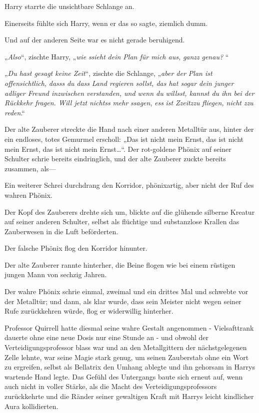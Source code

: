 {Harry starrte die unsichtbare Schlange an.

Einerseits fühlte sich Harry, wenn er das so sagte, ziemlich dumm.

Und auf der anderen Seite war es nicht gerade beruhigend.

„\emph{Also}“, zischte Harry, „\emph{wie} \emph{ssieht} \emph{dein Plan für mich aus,} \emph{ganzz} \emph{genau?} “

„\emph{Du hast gesagt keine Zeit}“, zischte die Schlange, „\emph{aber der Plan ist offensichtlich,} \emph{dasss} \emph{du} \emph{dass} \emph{Land regieren sollst, das hat sogar dein junger adliger Freund inzwischen verstanden, und wenn du} \emph{willsst, kannst du ihn bei der Rückkehr fragen. Will jetzt} \emph{nichtss} \emph{mehr} \emph{ssagen}, \emph{ess} \emph{ist} \emph{Zzeitzzu} \emph{fliegen, nicht} \emph{zzu} \emph{reden}.“

Der alte Zauberer streckte die Hand nach einer anderen Metalltür aus, hinter der ein endloses, totes Gemurmel erscholl: „Das ist nicht mein Ernst, das ist nicht mein Ernst, das ist nicht mein Ernst…“. Der rot-goldene Phönix auf seiner Schulter schrie bereits eindringlich, und der alte Zauberer zuckte bereits zusammen, als—

Ein weiterer Schrei durchdrang den Korridor, phönixartig, aber nicht der Ruf des wahren Phönix.

Der Kopf des Zauberers drehte sich um, blickte auf die glühende silberne Kreatur auf seiner anderen Schulter, selbst als flüchtige und substanzlose Krallen das Zauberwesen in die Luft beförderten.

Der falsche Phönix flog den Korridor hinunter.

Der alte Zauberer rannte hinterher, die Beine flogen wie bei einem rüstigen jungen Mann von sechzig Jahren.

Der wahre Phönix schrie einmal, zweimal und ein drittes Mal und schwebte vor der Metalltür; und dann, als klar wurde, dass sein Meister nicht wegen seiner Rufe zurückkehren würde, flog er widerwillig hinterher.

Professor Quirrell hatte diesmal seine wahre Gestalt angenommen - Vielsafttrank dauerte ohne eine neue Dosis nur eine Stunde an - und obwohl der Verteidigungsprofessor blass war und an den Metallgittern der nächstgelegenen Zelle lehnte, war seine Magie stark genug, um seinen Zauberstab ohne ein Wort zu ergreifen, selbst als Bellatrix den Umhang ablegte und ihn gehorsam in Harrys wartende Hand legte. Das Gefühl des Untergangs baute sich erneut auf, wenn auch nicht in voller Stärke, als die Macht des Verteidigungsprofessors zurückkehrte und die Ränder seiner gewaltigen Kraft mit Harrys leicht kindlicher Aura kollidierten.

}
